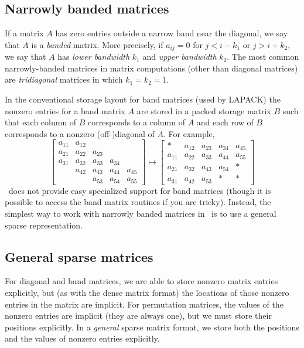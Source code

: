 \documentclass[12pt, leqno]{article} %
\begin{document}
\subsection{Narrowly banded matrices}

If a matrix $A$ has zero entries outside a narrow band near the
diagonal, we say that $A$ is a {\em banded} matrix.  More precisely,
if $a_{ij} = 0$ for $j < i-k_1$ or $j > i+k_2$, we say that $A$
has {\em lower bandwidth} $k_1$ and {\em upper bandwidth} $k_2$.
The most common narrowly-banded matrices in matrix computations
(other than diagonal matrices) are {\em tridiagonal} matrices in
which $k_1 = k_2 = 1$.

In the conventional storage layout for band matrices (used by LAPACK)
the nonzero entries for a band matrix $A$ are stored in a packed
storage matrix $B$ such that each column of $B$ corresponds to a column
of $A$ and each row of $B$ corresponds to a nonzero (off-)diagonal of $A$.
For example,
\[
  \begin{bmatrix}
    a_{11} & a_{12} \\
    a_{21} & a_{22} & a_{23} \\
    a_{31} & a_{32} & a_{33} & a_{34} \\
    & a_{42} & a_{43} & a_{44} & a_{45} \\
    & & a_{53} & a_{54} & a_{55}
  \end{bmatrix} \mapsto
  \begin{bmatrix}
    * & a_{12} & a_{23} & a_{34} & a_{45} \\
    a_{11} & a_{22} & a_{33} & a_{44} & a_{55} \\
    a_{21} & a_{32} & a_{43} & a_{54} & * \\
    a_{31} & a_{42} & a_{53} & * & *
  \end{bmatrix}
\]
\matlab\ does not provide easy specialized support for band matrices
(though it is possible to access the band matrix routines if you
are tricky).  Instead, the simplest way to work with narrowly banded
matrices in \matlab\ is to use a general sparse representation.

\subsection{General sparse matrices}

For diagonal and band matrices, we are able to store nonzero matrix
entries explicitly, but (as with the dense matrix format) the locations
of those nonzero entries in the matrix are implicit.  For permutation
matrices, the values of the nonzero entries are implicit (they are
always one), but we must store their positions explicitly.  In a
{\em general} sparse matrix format, we store both the positions and
the values of nonzero entries explicitly.
\end{document}
